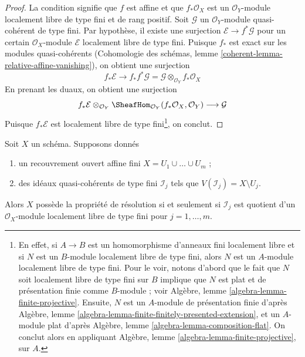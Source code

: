 \begin{proof}
La condition signifie que $f$ est affine et que $f_*\mathcal{O}_X$
est un $\mathcal{O}_Y$-module localement libre de type fini et de rang positif.
Soit $\mathcal{G}$ un $\mathcal{O}_Y$-module quasi-cohérent
de type fini. Par hypothèse, il existe une surjection
$\mathcal{E} \to f^*\mathcal{G}$ pour un certain $\mathcal{O}_X$-module
$\mathcal{E}$ localement libre de type fini. Puisque $f_*$ est exact sur les
modules quasi-cohérents
(Cohomologie des schémas, lemme \ref{coherent-lemma-relative-affine-vanishing}),
on obtient une surjection
$$
f_*\mathcal{E}
\longrightarrow
f_*f^*\mathcal{G} = \mathcal{G} \otimes_{\mathcal{O}_Y} f_*\mathcal{O}_X
$$
En prenant les duaux, on obtient une surjection
$$
f_*\mathcal{E}
\otimes_{\mathcal{O}_Y}
\SheafHom_{\mathcal{O}_Y}(f_*\mathcal{O}_X, \mathcal{O}_Y)
\longrightarrow
\mathcal{G}
$$
Puisque $f_*\mathcal{E}$ est localement libre de type fini\footnote{En effet,
si $A \to B$ est un homomorphisme d'anneaux fini localement libre
et si $N$ est un $B$-module localement libre de type fini, alors $N$
est un $A$-module localement libre de type fini. Pour le voir, notons d'abord
que le fait que $N$ soit localement libre de type fini sur $B$ implique que $N$ est
plat et de présentation finie comme $B$-module ; voir
Algèbre, lemme \ref{algebra-lemma-finite-projective}. Ensuite,
$N$ est un $A$-module de présentation finie d'après
Algèbre, lemme \ref{algebra-lemma-finite-finitely-presented-extension},
et un $A$-module plat d'après Algèbre, lemme \ref{algebra-lemma-composition-flat}.
On conclut alors en appliquant
Algèbre, lemme \ref{algebra-lemma-finite-projective}, sur $A$.},
on conclut.
\end{proof}

\begin{lemma}
\label{lemma-resolution-property-finite-number}
Soit $X$ un schéma. Supposons donnés
\begin{enumerate}
\item un recouvrement ouvert affine fini $X = U_1 \cup \ldots \cup U_m$ ;
\item des idéaux quasi-cohérents de type fini $\mathcal{I}_j$
tels que $V(\mathcal{I}_j) = X \setminus U_j$.
\end{enumerate}
Alors $X$ possède la propriété de résolution si et seulement si $\mathcal{I}_j$
est quotient d'un $\mathcal{O}_X$-module localement libre de type fini
pour $j = 1, \ldots, m$.
\end{lemma}

